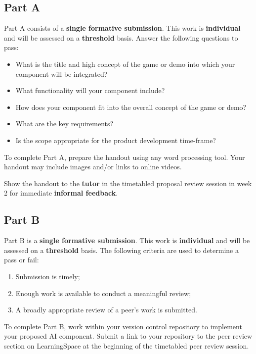 \documentclass{../../fal_assignment}
\begin{document}
\subsection*{Part A}

Part A consists of a \textbf{single formative submission}. This work is \textbf{individual} and will be assessed on a \textbf{threshold} basis. Answer the following questions to pass:

\begin{itemize}
	\item What is the title and high concept of the game or demo into which your component will be integrated?
	\item What functionality will your component include?
	\item How does your component fit into the overall concept of the game or demo?
	\item What are the key requirements?
	\item Is the scope appropriate for the product development time-frame?
\end{itemize}

To complete Part A, prepare the handout using any word processing tool.
Your handout may include images and/or links to online videos.

Show the handout to the \textbf{tutor} in the timetabled proposal review session in week 2 for immediate \textbf{informal feedback}.

\subsection*{Part B}

Part B is a \textbf{single formative submission}. This work is \textbf{individual} and will be assessed on a \textbf{threshold} basis. The following criteria are used to determine a pass or fail:

\begin{enumerate}[label=(\alph*)]
	\item Submission is timely;
	\item Enough work is available to conduct a meaningful review;
	\item A broadly appropriate review of a peer's work is submitted.
\end{enumerate}

To complete Part B, work within your version control repository to implement your proposed AI component.
Submit a link to your repository to the peer review section on LearningSpace at the beginning of the timetabled peer review session.
\end{document}
